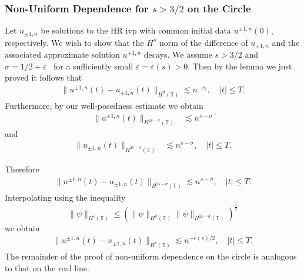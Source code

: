 \documentclass{beamer}
\newcommand{\ci}{\mathbb{T}}
\newcommand{\ee}{\varepsilon}
\begin{document}
\begin{frame}
	\frametitle{Non-Uniform Dependence for $s > 3/2$ on the Circle}
%
%
%
Let $u_{\pm 1, n}$ be solutions to the HR ivp with common initial data 
$u^{\pm 1,
n}(0)$, respectively.
We wish to show that the $H^s$ norm of the difference of $u_{\pm 1,
n}$ and the associated approximate solution $u^{\pm 1, n}$ decays.
We assume
$s > 3/2 $ and $\sigma = 1/2 + \ee$ \ for a sufficiently small
$\ee= \ee(s) > 0$. 
Then by the lemma we just proved it follows that 
%
%
\begin{equation*}
\begin{split}
\|u^{\pm 1, n}(t) - u_{\pm 1, n} (t) \|_{H^\sigma (\ci)} \lesssim n^{-r_s}
\label{6h}, \quad |t| \le T.
\end{split}
\end{equation*}
%
%
\pause
Furthermore, by our well-posedness estimate we obtain
%
%
\begin{equation*}
\begin{split}
\|u^{\pm 1, n} (t) \|_{H^{2s - \sigma} (\ci)}
& \lesssim n^{s-\sigma}
\label{4}
\end{split}
\end{equation*}
%
%
and 
\begin{equation*}
	\begin{split}
\|u_{\pm 1, n} (t) \|_{H^{2s - \sigma}(\ci)}
& \lesssim n^{s- \sigma}, \quad |t| \le T.
\label{final-est-Hk-norm-sol}
\end{split}
\end{equation*}
%
%
%
%
%
\end{frame}
%
%
\begin{frame}
Therefore
%
\begin{equation*}
\begin{split}
\|u^{\pm 1, n} (t) - u_{\pm 1, n}(t)\|_{H^{2s - \sigma}(\ci)}
\lesssim n^{s-\sigma}, \quad |t| \le T.
\label{5h}
\end{split}
\end{equation*}
%
%
\pause
%
%
Interpolating using the
inequality
%
\begin{equation*}
\|\psi \|_{H^s (\ci)} \leq  (\| \psi \|_{H^\sigma (\ci)} \| \psi
\|_{H^{2s-\sigma}(\ci)})^\frac12
\end{equation*}
%
%
we obtain
%
%
\begin{equation*}
\begin{split}
\|u^{\pm 1,n}(t) - u_{\pm 1, n}(t) \|_{H^s (\ci)} \lesssim
n^{-\ee(s)/2}, \quad |t| \le T.
\label{10h}
\end{split}
\end{equation*}
%
%
The remainder of the proof of non-uniform dependence on the circle is
analogous to that on the real line. \qquad \qedsymbol

\end{frame}
\end{document}
